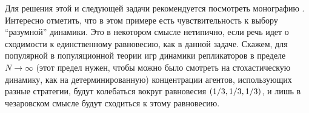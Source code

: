 \begin{remark}
 Для решения этой и следующей задачи рекомендуется 
посмотреть монографию \cite{222}. Интересно 
отметить, что в этом примере есть чувствительность к выбору ``разумной'' 
динамики. Это в некотором смысле нетипично, если речь идет о сходимости к 
единственному равновесию, как в данной задаче. Скажем, для популярной в 
популяционной теории игр динамики репликаторов в пределе $N\to \infty $ 
(этот предел нужен, чтобы можно было смотреть на стохастическую динамику, 
как на детерминированную) концентрации агентов, использующих разные 
стратегии, будут колебаться вокруг равновесия $\left( {1 \mathord{\left/ 
{\vphantom {1 3}} \right. \kern-\nulldelimiterspace} 3,1 \mathord{\left/ 
{\vphantom {1 3}} \right. \kern-\nulldelimiterspace} 3,1 \mathord{\left/ 
{\vphantom {1 3}} \right. \kern-\nulldelimiterspace} 3} \right)$, и лишь в 
чезаровском смысле будут сходиться к этому равновесию.
\end{remark}

